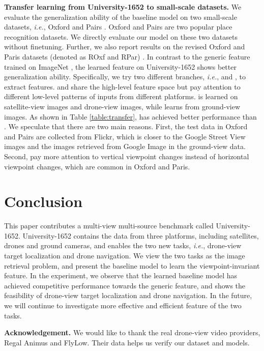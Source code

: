 \documentclass[sigconf]{acmart}
\def\ie{\emph{i.e.}}
\begin{document}
\noindent\textbf{Transfer learning from University-1652 to small-scale datasets.} 
We evaluate the generalization ability of the baseline model on two small-scale datasets, \ie, Oxford \cite{philbin2007object} and Pairs \cite{philbin2008lost}. Oxford and Pairs are two popular place recognition datasets. We directly evaluate our model on these two datasets without finetuning. Further, we also report results on the revised Oxford and Paris datasets (denoted as ROxf and RPar) \cite{RITAC18}. In contrast to the generic feature trained on ImageNet \cite{deng2009imagenet}, the learned feature on University-1652 shows better generalization ability. Specifically, we try two different branches, \ie,  and , to extract features.  and  share the high-level feature space but pay attention to different low-level patterns of inputs from different platforms.  is learned on satellite-view images and drone-view images, while  learns from ground-view images. As shown in Table \ref{table:transfer},  has achieved better performance than . We speculate that there are two main reasons. First, the test data in Oxford and Pairs are collected from Flickr, which is closer to the Google Street View images and the images retrieved from Google Image in the ground-view data. Second,  pay more attention to vertical viewpoint changes instead of horizontal viewpoint changes, which are common in Oxford and Paris.

\section{Conclusion}
This paper contributes a multi-view multi-source benchmark called University-1652. University-1652 contains the data from three platforms, including satellites, drones and ground cameras, and enables the two new tasks, \ie, drone-view target localization and drone navigation. We view the two tasks as the image retrieval problem, and present the baseline model to learn the viewpoint-invariant feature. In the experiment, we observe that the learned baseline model has achieved competitive performance towards the generic feature, and shows the feasibility of drone-view target localization and drone navigation. In the future, we will continue to investigate more effective and efficient feature of the two tasks. 

\noindent\textbf{Acknowledgement.} We would like to thank the real drone-view video providers, Regal Animus and FlyLow. Their data helps us verify our dataset and models. 

{


}
\end{document}
